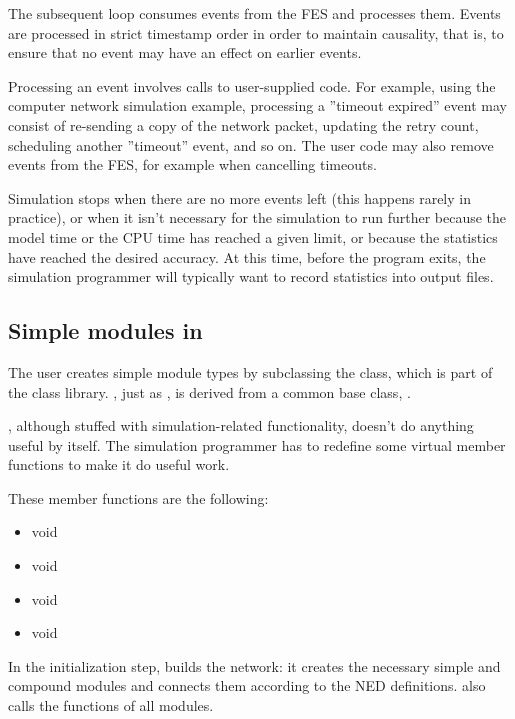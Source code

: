 The subsequent loop consumes events from the FES and processes
them. Events are processed in strict timestamp order in order
to maintain causality, that is, to ensure that no event may have
an effect on earlier events.

Processing an event involves calls to user-supplied code. For example,
using the computer network simulation example, processing a ''timeout
expired'' event may consist of re-sending a copy of the network
packet, updating the retry count, scheduling another ''timeout''
event, and so on. The user code may also remove events from the FES,
for example when cancelling timeouts.

Simulation stops when there are no more events left (this happens
rarely in practice), or when it isn't necessary for the simulation
to run further because the model time or the CPU time has reached
a given limit, or because the statistics have reached the desired
accuracy. At this time, before the program exits, the simulation
programmer will typically want to record statistics into output
files.





\subsection{Simple modules in {\opp}}

The user creates simple module types by
subclassing the 
class, which is part of the {\opp} class library.
, just as , is derived
from a common base class, .

, although stuffed with simulation-related
functionality, doesn't do anything useful by itself. The simulation
programmer has to redefine some virtual member functions to make it do
useful work.


These member functions are the following:
\begin{itemize}
  \item{void }
  \item{void }
  \item{void }
  \item{void }
\end{itemize}

In the initialization step, {\opp} builds the network: it creates the
necessary simple and compound modules and
connects them according to the NED definitions. {\opp} also calls the
 functions of all modules.

